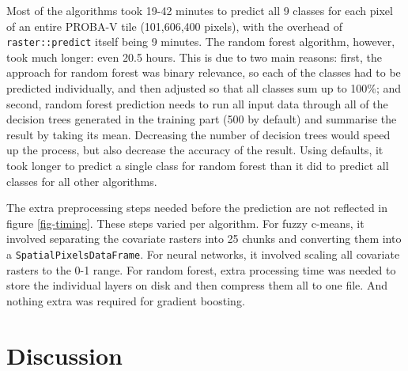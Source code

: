 \documentclass[a4paper,10pt]{book}
\begin{document}
Most of the algorithms took 19-42 minutes to predict all 9 classes for each pixel of an entire PROBA-V tile (101,606,400 pixels), with the overhead of \texttt{raster::predict} itself being 9 minutes. The random forest algorithm, however, took much longer: even 20.5 hours. This is due to two main reasons: first, the approach for random forest was binary relevance, so each of the classes had to be predicted individually, and then adjusted so that all classes sum up to 100\%; and second, random forest prediction needs to run all input data through all of the decision trees generated in the training part (500 by default) and summarise the result by taking its mean. Decreasing the number of decision trees would speed up the process, but also decrease the accuracy of the result. Using defaults, it took longer to predict a single class for random forest than it did to predict all classes for all other algorithms.

The extra preprocessing steps needed before the prediction are not reflected in figure \ref{fig-timing}. These steps varied per algorithm. For fuzzy c-means, it involved separating the covariate rasters into 25 chunks and converting them into a \texttt{SpatialPixelsDataFrame}. For neural networks, it involved scaling all covariate rasters to the 0-1 range. For random forest, extra processing time was needed to store the individual layers on disk and then compress them all to one file. And nothing extra was required for gradient boosting.

\chapter{Discussion}

\end{document}
